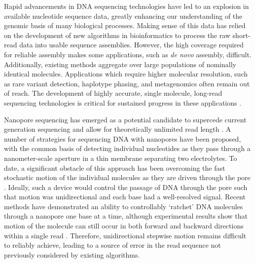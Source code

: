 \documentclass{biophys_letter}
\begin{document}

Rapid advancements in DNA sequencing technologies have led to an explosion in available nucleotide sequence data, greatly enhancing our understanding of the genomic basis of many biological processes.
Making sense of this data has relied on the development of new algorithms in bioinformatics to process the raw short-read data into usable sequence assemblies.
However, the high coverage required for reliable assembly makes some applications, such as \emph{de novo} assembly, difficult.
Additionally, existing methods aggregate over large populations of nominally identical molecules.
Applications which require higher molecular resolution, such as rare variant detection, haplotype phasing, and metagenomics often remain out of reach.
The development of highly accurate, single molecule, long-read sequencing technologies is critical for sustained progress in these applications \cite{Mak:2012}.

Nanopore sequencing has emerged as a potential candidate to supercede current generation sequencing and allow for theoretically unlimited read length \cite{Branton:2008}.
A number of strategies for sequencing DNA with nanopores have been proposed, with the common basis of detecting individual nucleotides as they pass through a nanometer-scale aperture in a thin membrane separating two electrolytes.
To date, a significant obstacle of this approach has been overcoming the fast stochastic motion of the individual molecules as they are driven through the pore \cite{Venkatesan:2011, Lu:2011}.
Ideally, such a device would control the passage of DNA through the pore such that motion was unidirectional and each base had a well-resolved signal.
Recent methods have demonstrated an ability to controllably `ratchet' DNA molecules through a nanopore one base at a time, although experimental results show that motion of the molecule can still occur in both forward and backward directions within a single read \cite{Luan:2011, Olasagasti:2010, Cherf:2012}.
Therefore, unidirectional stepwise motion remains difficult to reliably achieve, leading to a source of error in the read sequence not previously considered by existing algorithms.
\end{document}
